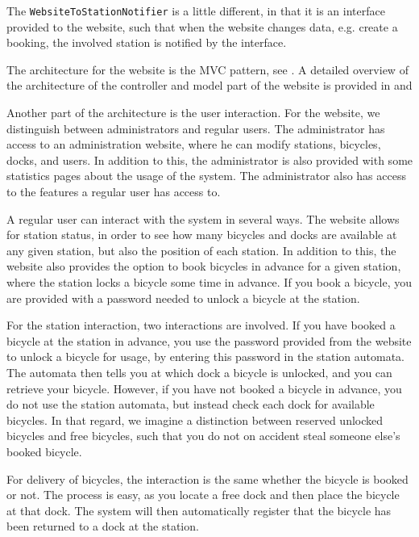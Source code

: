 The \texttt{WebsiteToStationNotifier} is a little different, in that it is an interface provided to the website, such that when the website changes data, e.g. create a booking, the involved station is notified by the interface.

The architecture for the website is the MVC pattern, see .
A detailed overview of the architecture of the controller and model part of the website is provided in  and 

Another part of the architecture is the user interaction.
For the website, we distinguish between administrators and regular users.
The administrator has access to an administration website, where he can modify stations, bicycles, docks, and users.
In addition to this, the administrator is also provided with some statistics pages about the usage of the system.
The administrator also has access to the features a regular user has access to.

A regular user can interact with the system in several ways.
The website allows for station status, in order to see how many bicycles and docks are available at any given station, but also the position of each station.
In addition to this, the website also provides the option to book bicycles in advance for a given station, where the station locks a bicycle some time in advance.
If you book a bicycle, you are provided with a password needed to unlock a bicycle at the station.

For the station interaction, two interactions are involved.
If you have booked a bicycle at the station in advance, you use the password provided from the website to unlock a bicycle for usage, by entering this password in the station automata.
The automata then tells you at which dock a bicycle is unlocked, and you can retrieve your bicycle.
However, if you have not booked a bicycle in advance, you do not use the station automata, but instead check each dock for available bicycles.
In that regard, we imagine a distinction between reserved unlocked bicycles and free bicycles, such that you do not on accident steal someone else's booked bicycle.

For delivery of bicycles, the interaction is the same whether the bicycle is booked or not.
The process is easy, as you locate a free dock and then place the bicycle at that dock.
The system will then automatically register that the bicycle has been returned to a dock at the station.


